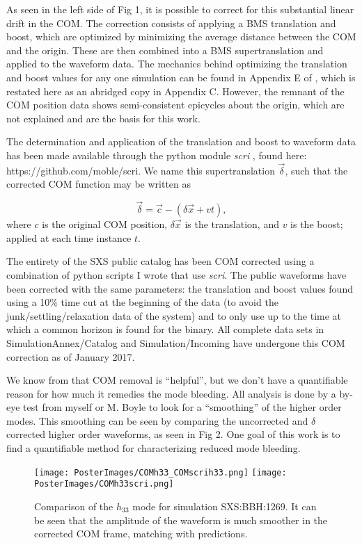 \documentclass{article}
\begin{document}
As seen in the left side of Fig 1, it is possible to correct for this substantial linear drift in the COM. The correction consists of applying a BMS translation and boost, which are optimized by minimizing the average distance between the COM and the origin. These are then combined into a BMS supertranslation and applied to the waveform data. The mechanics behind optimizing the translation and boost values for any one simulation can be found in Appendix E of \cite{MB16}, which is restated here as an abridged copy in Appendix C. However, the remnant of the COM position data shows semi-consistent epicycles about the origin, which are not explained and are the basis for this work.


The determination and application of the translation and boost to waveform data has been made available through the python module \textit{scri} \cite{MB16}, found here: https://github.com/moble/scri. We name this supertranslation $\vec{\delta}$, such that the corrected COM function may be written as

\begin{equation}
\vec{\delta} = \vec{c} -(\delta \vec{x} + vt),
\end{equation}
where $c$ is the original COM position, $\delta \vec{x}$ is the translation, and $v$ is the boost; applied at each time instance $t$.

The entirety of the SXS public catalog has been COM corrected using a combination of python scripts I wrote that use \textit{scri}. The public waveforms have been corrected with the same parameters: the translation and boost values found using a 10\% time cut at the beginning of the data (to avoid the junk/settling/relaxation data of the system) and to only use up to the time at which a common horizon is found for the binary. All complete data sets in SimulationAnnex/Catalog and Simulation/Incoming have undergone this COM correction as of January 2017.

We know from \cite{MB16} that COM removal is ``helpful'', but we don't have a quantifiable reason for how much it remedies the mode bleeding. All analysis is done by a by-eye test from myself or M. Boyle to look for a ``smoothing'' of the higher order modes. This smoothing can be seen by comparing the uncorrected and $\delta$ corrected higher order waveforms, as seen in Fig 2. One goal of this work is to find a quantifiable method for characterizing reduced mode bleeding.

\begin{figure}
	\texttt{[image: PosterImages/COMh33\_COMscrih33.png]}
	\texttt{[image: PosterImages/COMh33scri.png]}
	\caption{Comparison of the $h_{33}$ mode for simulation SXS:BBH:1269. It can be seen that the amplitude of the waveform is much smoother in the corrected COM frame, matching with predictions.}
\end{figure}
\end{document}
